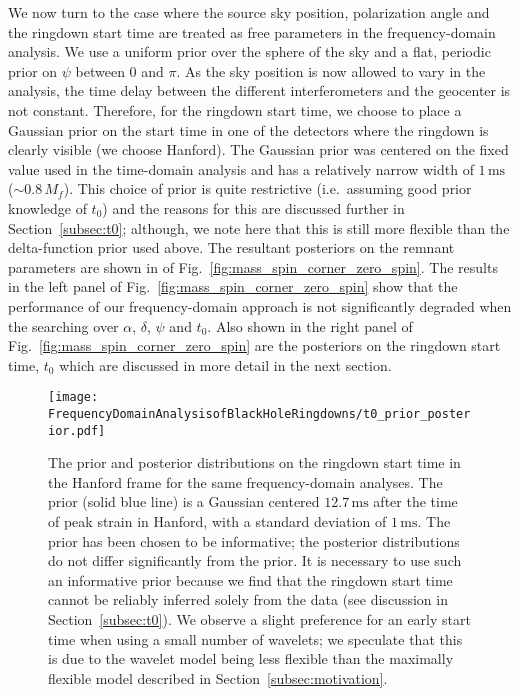 We now turn to the case where the source sky position, polarization angle and the ringdown start time are treated as free parameters in the frequency-domain analysis.
We use a uniform prior over the sphere of the sky and a flat, periodic prior on $\psi$ between $0$ and $\pi$.
As the sky position is now allowed to vary in the analysis, the time delay between the different interferometers and the geocenter is not constant. 
Therefore, for the ringdown start time, we choose to place a Gaussian prior on the start time in one of the detectors where the ringdown is clearly visible (we choose Hanford). 
The Gaussian prior was centered on the fixed value used in the time-domain analysis and has a relatively narrow width of $1\,\mathrm{ms}$ ($\sim 0.8\,M_f$).
This choice of prior is quite restrictive (i.e.\ assuming good prior knowledge of $t_0$) and the reasons for this are discussed further in Section~\ref{subsec:t0}; although, we note here that this is still more flexible than the delta-function prior used above.
The resultant posteriors on the remnant parameters are shown in  of Fig.~\ref{fig:mass_spin_corner_zero_spin}.
The results in the left panel of Fig.~\ref{fig:mass_spin_corner_zero_spin} show that the performance of our frequency-domain approach is not significantly degraded when the searching over $\alpha$, $\delta$, $\psi$ and $t_0$.
Also shown in the right panel of Fig.~\ref{fig:mass_spin_corner_zero_spin} are the posteriors on the ringdown start time, $t_0$ which are discussed in more detail in the next section.

\begin{figure}
    \centering
    \texttt{[image: FrequencyDomainAnalysisofBlackHoleRingdowns/t0\_prior\_posterior.pdf]}
    \caption[SHORT CAPTION]{ 
    The prior and posterior distributions on the ringdown start time in the Hanford frame for the same frequency-domain analyses. The prior (solid blue line) is a Gaussian centered $12.7\,\mathrm{ms}$ after the time of peak strain in Hanford, with a standard deviation of $1\,\mathrm{ms}$. The prior has been chosen to be informative; the posterior distributions do not differ significantly from the prior.
    It is necessary to use such an informative prior because we find that the ringdown start time cannot be reliably inferred solely from the data (see discussion in Section~\ref{subsec:t0}).
    We observe a slight preference for an early start time when using a small number of wavelets; we speculate that this is due to the wavelet model being less flexible than the maximally flexible model described in Section~\ref{subsec:motivation}.
    }
    \label{fig:t0_prior_posterior}
\end{figure}

